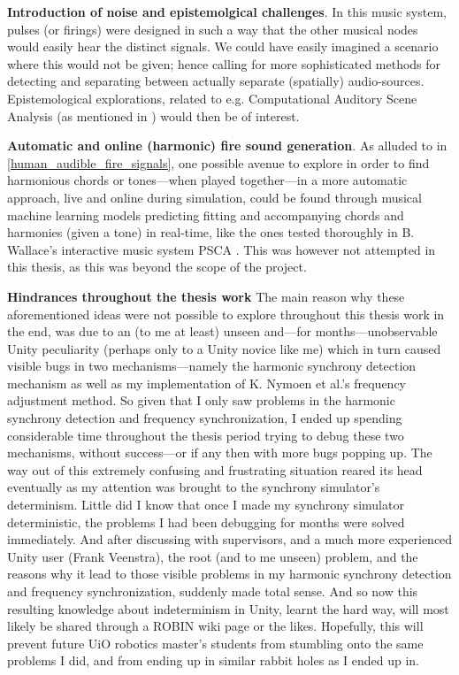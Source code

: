 \textbf{Introduction of noise and epistemolgical challenges}. In this music system, pulses (or firings) were designed in such a way that the other musical nodes would easily hear the distinct signals. We could have easily imagined a scenario where this would not be given; hence calling for more sophisticated methods for detecting and separating between actually separate (spatially) audio-sources. Epistemological explorations, related to e.g. Computational Auditory Scene Analysis (as mentioned in \cite{casa}) would then be of interest.

\textbf{Automatic and online (harmonic) fire sound generation}. As alluded to in \ref{human_audible_fire_signals}, one possible avenue to explore in order to find harmonious chords or tones—when played together—in a more automatic approach, live and online during simulation, could be found through musical machine learning models predicting fitting and accompanying chords and harmonies (given a tone) in real-time, like the ones tested thoroughly in B. Wallace's interactive music system PSCA \cite{wallace_PSCA}. This was however not attempted in this thesis, as this was beyond the scope of the project.

\textbf{Hindrances throughout the thesis work}
The main reason why these aforementioned ideas were not possible to explore throughout this thesis work in the end, was due to an (to me at least) unseen and—for months—unobservable Unity peculiarity (perhaps only to a Unity novice like me) which in turn caused visible bugs in two mechanisms—namely the harmonic synchrony detection mechanism as well as my implementation of K. Nymoen et al.'s frequency adjustment method. So given that I only saw problems in the harmonic synchrony detection and frequency synchronization, I ended up spending considerable time throughout the thesis period trying to debug these two mechanisms, without success—or if any then with more bugs popping up. The way out of this extremely confusing and frustrating situation reared its head eventually as my attention was brought to the synchrony simulator's determinism. Little did I know that once I made my synchrony simulator deterministic, the problems I had been debugging for months were solved immediately. And after discussing with supervisors, and a much more experienced Unity user (Frank Veenstra), the root (and to me unseen) problem, and the reasons why it lead to those visible problems in my harmonic synchrony detection and frequency synchronization, suddenly made total sense. And so now this resulting knowledge about indeterminism in Unity, learnt the hard way, will most likely be shared through a ROBIN wiki page or the likes. Hopefully, this will prevent future UiO robotics master's students from stumbling onto the same problems I did, and from ending up in similar rabbit holes as I ended up in.